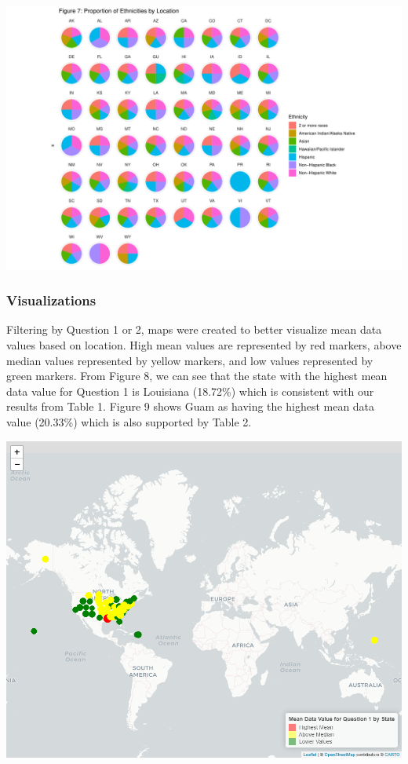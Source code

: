 \documentclass[
]{article}
\begin{document}
\includegraphics{FinalPM566---Rmarkdown_files/figure-latex/unnamed-chunk-29-1.pdf}

\subsubsection{Visualizations}\label{visualizations}

Filtering by Question 1 or 2, maps were created to better visualize mean
data values based on location. High mean values are represented by red
markers, above median values represented by yellow markers, and low
values represented by green markers. From Figure 8, we can see that the
state with the highest mean data value for Question 1 is Louisiana
(18.72\%) which is consistent with our results from Table 1. Figure 9
shows Guam as having the highest mean data value (20.33\%) which is also
supported by Table 2.

\includegraphics{FinalPM566---Rmarkdown_files/figure-latex/unnamed-chunk-33-1.png}
\end{document}
